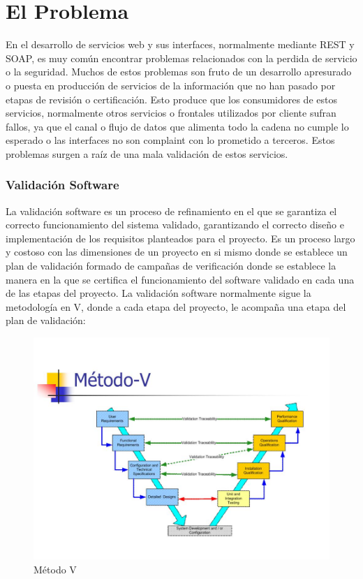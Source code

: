 \documentclass[a4paper,11pt]{book}
\begin{document}
\chapter{El Problema}

En el desarrollo de servicios web y sus interfaces, normalmente mediante REST y SOAP, es muy común encontrar problemas relacionados con la perdida de servicio o la seguridad. Muchos de estos problemas son fruto de un desarrollo apresurado o puesta en producción de servicios de la información que no han pasado por etapas de revisión o certificación. Esto produce que los consumidores de estos servicios, normalmente otros servicios o frontales utilizados por cliente sufran fallos, ya que el canal o flujo de datos que alimenta todo la cadena no cumple lo esperado o las interfaces no son complaint con lo prometido a terceros. Estos problemas surgen a raíz de una mala validación de estos servicios. 

\subsection{Validación Software}

La validación\cite{v} software es un proceso de refinamiento en el que se garantiza el correcto funcionamiento del sistema validado, garantizando el correcto diseño e implementación de los requisitos planteados para el proyecto. Es un proceso largo y costoso con las dimensiones de un proyecto en si mismo donde se establece un plan de validación formado de campañas de verificación donde se establece la manera en la que se certifica el funcionamiento del software validado en cada una de las etapas del proyecto. La validación software normalmente sigue la metodología en V, donde a cada etapa del proyecto, le acompaña una etapa del plan de validación: 
\begin{figure}[H]  
\centering 
\includegraphics[scale=0.35]{imagenes/v.jpg}
\caption{ Método V }  
\end{figure} 
\end{document}
